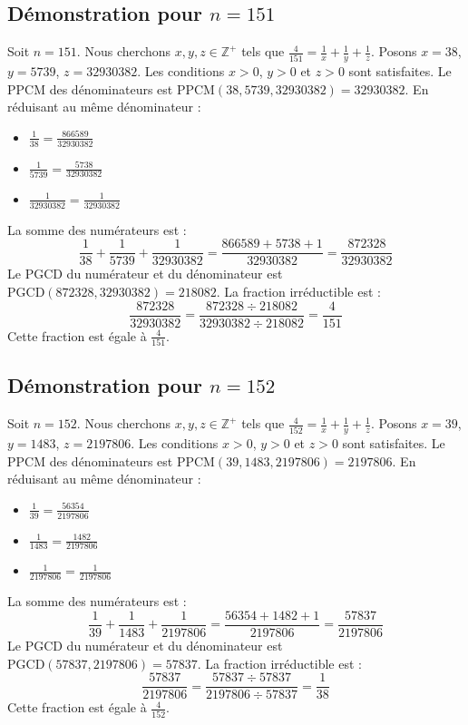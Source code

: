 \documentclass[11pt,a4paper]{article}
\begin{document}
\subsection{Démonstration pour $n = 151$}
Soit $n = 151$. Nous cherchons $x, y, z \in \mathbb{Z}^{+}$ tels que $\frac{4}{151} = \frac{1}{x} + \frac{1}{y} + \frac{1}{z}$.
Posons $x = 38$, $y = 5739$, $z = 32930382$.
Les conditions $x > 0$, $y > 0$ et $z > 0$ sont satisfaites.
Le PPCM des dénominateurs est $\text{PPCM}(38, 5739, 32930382) = 32930382$.
En réduisant au même dénominateur :
\begin{itemize}
    \item $\frac{1}{38} = \frac{866589}{32930382}$
    \item $\frac{1}{5739} = \frac{5738}{32930382}$
    \item $\frac{1}{32930382} = \frac{1}{32930382}$
\end{itemize}
La somme des numérateurs est :
$$ \frac{1}{38} + \frac{1}{5739} + \frac{1}{32930382} = \frac{866589 + 5738 + 1}{32930382} = \frac{872328}{32930382} $$
Le PGCD du numérateur et du dénominateur est $\text{PGCD}(872328, 32930382) = 218082$.
La fraction irréductible est :
$$ \frac{872328}{32930382} = \frac{872328 \div 218082}{32930382 \div 218082} = \frac{4}{151} $$
Cette fraction est égale à $\frac{4}{151}$.

\subsection{Démonstration pour $n = 152$}
Soit $n = 152$. Nous cherchons $x, y, z \in \mathbb{Z}^{+}$ tels que $\frac{4}{152} = \frac{1}{x} + \frac{1}{y} + \frac{1}{z}$.
Posons $x = 39$, $y = 1483$, $z = 2197806$.
Les conditions $x > 0$, $y > 0$ et $z > 0$ sont satisfaites.
Le PPCM des dénominateurs est $\text{PPCM}(39, 1483, 2197806) = 2197806$.
En réduisant au même dénominateur :
\begin{itemize}
    \item $\frac{1}{39} = \frac{56354}{2197806}$
    \item $\frac{1}{1483} = \frac{1482}{2197806}$
    \item $\frac{1}{2197806} = \frac{1}{2197806}$
\end{itemize}
La somme des numérateurs est :
$$ \frac{1}{39} + \frac{1}{1483} + \frac{1}{2197806} = \frac{56354 + 1482 + 1}{2197806} = \frac{57837}{2197806} $$
Le PGCD du numérateur et du dénominateur est $\text{PGCD}(57837, 2197806) = 57837$.
La fraction irréductible est :
$$ \frac{57837}{2197806} = \frac{57837 \div 57837}{2197806 \div 57837} = \frac{1}{38} $$
Cette fraction est égale à $\frac{4}{152}$.
\end{document}
